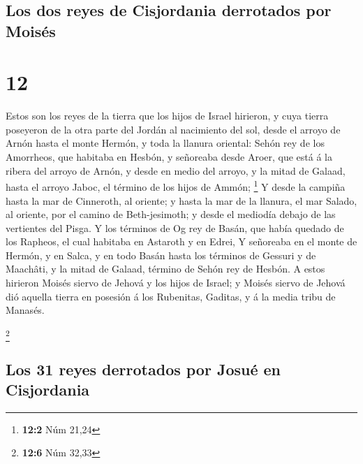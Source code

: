 \hypertarget{los-dos-reyes-de-cisjordania-derrotados-por-moisuxe9s}{%
\subsection{Los dos reyes de Cisjordania derrotados por
Moisés}\label{los-dos-reyes-de-cisjordania-derrotados-por-moisuxe9s}}

\hypertarget{section-11}{%
\section{12}\label{section-11}}

 Estos son los reyes de la tierra que los hijos de Israel
hirieron, y cuya tierra poseyeron de la otra parte del Jordán al
nacimiento del sol, desde el arroyo de Arnón hasta el monte Hermón, y
toda la llanura oriental:  Sehón rey de los Amorrheos, que
habitaba en Hesbón, y señoreaba desde Aroer, que está á la ribera del
arroyo de Arnón, y desde en medio del arroyo, y la mitad de Galaad,
hasta el arroyo Jaboc, el término de los hijos de Ammón; \footnote{\textbf{12:2}
  Núm 21,24}  Y desde la campiña hasta la mar de Cinneroth,
al oriente; y hasta la mar de la llanura, el mar Salado, al oriente, por
el camino de Beth-jesimoth; y desde el mediodía debajo de las vertientes
del Pisga.  Y los términos de Og rey de Basán, que había
quedado de los Rapheos, el cual habitaba en Astaroth y en Edrei,
 Y señoreaba en el monte de Hermón, y en Salca, y en todo
Basán hasta los términos de Gessuri y de Maachâti, y la mitad de Galaad,
término de Sehón rey de Hesbón.  A estos hirieron Moisés
siervo de Jehová y los hijos de Israel; y Moisés siervo de Jehová dió
aquella tierra en posesión á los Rubenitas, Gaditas, y á la media tribu
de Manasés.

\footnote{\textbf{12:6} Núm 32,33}

\hypertarget{los-31-reyes-derrotados-por-josuuxe9-en-cisjordania}{%
\subsection{Los 31 reyes derrotados por Josué en
Cisjordania}\label{los-31-reyes-derrotados-por-josuuxe9-en-cisjordania}}

